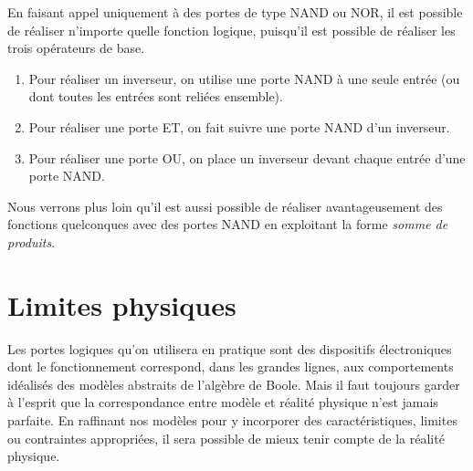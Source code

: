 \documentclass[letter, oneside]{book}
\begin{document}
En faisant appel uniquement à des portes de type NAND ou NOR, il est
possible de réaliser n'importe quelle fonction logique, puisqu'il est
possible de réaliser les trois opérateurs de base.

\begin{enumerate}
\item Pour réaliser un inverseur, on utilise une porte NAND à une seule
entrée (ou dont toutes les entrées sont reliées ensemble).
\item Pour réaliser une porte ET, on fait suivre une porte NAND d'un
inverseur.
\item Pour réaliser une porte OU, on place un inverseur devant chaque
entrée d'une porte NAND.
\end{enumerate}

Nous verrons plus loin qu'il est aussi possible de réaliser
avantageusement des fonctions quelconques avec des portes NAND en
exploitant la forme \emph{somme de produits}.

\section{Limites physiques}
\label{sec:org983fc5a}

Les portes logiques qu'on utilisera en pratique sont des dispositifs
électroniques dont le fonctionnement correspond, dans les grandes
lignes, aux comportements idéalisés des modèles abstraits de l'algèbre
de Boole. Mais il faut toujours garder à l'esprit que la
correspondance entre modèle et réalité physique n'est jamais
parfaite. En raffinant nos modèles pour y incorporer des
caractéristiques, limites ou contraintes appropriées, il sera possible
de mieux tenir compte de la réalité physique.
\end{document}

